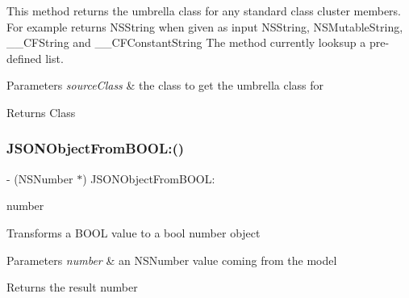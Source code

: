 This method returns the umbrella class for any standard class cluster members. For example returns N\+S\+String when given as input N\+S\+String, N\+S\+Mutable\+String, \+\_\+\+\_\+\+C\+F\+String and \+\_\+\+\_\+\+C\+F\+Constant\+String The method currently looksup a pre-\/defined list. 
\begin{DoxyParams}{Parameters}
{\em source\+Class} & the class to get the umbrella class for \\
\hline
\end{DoxyParams}
\begin{DoxyReturn}{Returns}
Class 
\end{DoxyReturn}
\mbox{\label{interface_o_p_t_l_y_j_s_o_n_value_transformer_a2b4a7ada8467e6adca9c60623f53f4eb}} 
\subsubsection{\texorpdfstring{J\+S\+O\+N\+Object\+From\+B\+O\+O\+L\+:()}{JSONObjectFromBOOL:()}}
{\footnotesize\ttfamily -\/ (N\+S\+Number $\ast$) J\+S\+O\+N\+Object\+From\+B\+O\+O\+L\+: \begin{DoxyParamCaption}\item[{(N\+S\+Number $\ast$)}]{number }\end{DoxyParamCaption}}

Transforms a B\+O\+OL value to a bool number object 
\begin{DoxyParams}{Parameters}
{\em number} & an N\+S\+Number value coming from the model \\
\hline
\end{DoxyParams}
\begin{DoxyReturn}{Returns}
the result number 
\end{DoxyReturn}
\mbox{\label{interface_o_p_t_l_y_j_s_o_n_value_transformer_abcc27ccc01a91eb265ded723b9e240a2}} 
